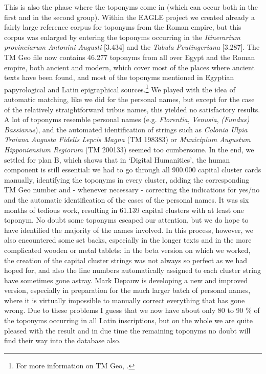 \documentclass[amsthm,ebook]{saparticle}
\begin{document}
This is also the phase where the toponyms come in (which can occur both in the first and in the second group).
Within the EAGLE project we created already a fairly large reference corpus for toponyms from the Roman empire, but
this corpus was enlarged by entering the toponyms occurring in the \emph{Itinerarium provinciarum Antonini Augusti} [3.434]
and the \emph{Tabula Peutingeriana} [3.287]. The TM Geo file now contains 46.277 toponyms from all over Egypt and the Roman
empire, both ancient and modern, which cover most of the places where ancient texts have been found, and most of the
toponyms mentioned in Egyptian papyrological and Latin epigraphical sources.\footnote{ For more information on TM Geo,
\citep{verreth2013}.} We played with the idea of automatic matching, like we did for the personal
names, but except for the case of the relatively straightforward tribus names, this yielded no satisfactory results. A
lot of toponyms resemble personal names (e.g. \emph{Florentia}, \emph{Venusia}, \emph{(Fundus) Bassianus}), and the automated identification
of strings such as \emph{Colonia Ulpia Traiana Augusta Fidelis Lepcis Magna }(TM 198383) or \emph{Municipium Augustum Hipponiensium
Regiorum} (TM 200133) seemed too cumbersome. In the end, we settled for plan B, which shows that in `Digital
Humanities', the human component is still essential: we had to go through all 900.000 capital cluster cards manually,
identifying the toponyms in every cluster, adding the corresponding TM Geo number and - whenever necessary - correcting
the indications for yes/no and the automatic identification of the cases of the personal names. It was six months of
tedious work, resulting in 61.139 capital clusters with at least one toponym. No doubt some toponyms escaped our
attention, but we do hope to have identified the majority of the names involved. In this process, however, we also
encountered some set backs, especially in the longer texts and in the more complicated wooden or metal tablets: in the
beta version on which we worked, the creation of the capital cluster strings was not always so perfect as we had hoped
for, and also the line numbers automatically assigned to each cluster string have sometimes gone astray. Mark Depauw is
developing a new and improved version, especially in preparation for the much larger batch of personal names, where it
is virtually impossible to manually correct everything that has gone wrong. Due to these problems I guess that we now
have about only 80 to 90 \% of the toponyms occurring in all Latin inscriptions, but on the whole we are quite pleased
with the result and in due time the remaining toponyms no doubt will find their way into the database also.
\end{document}
